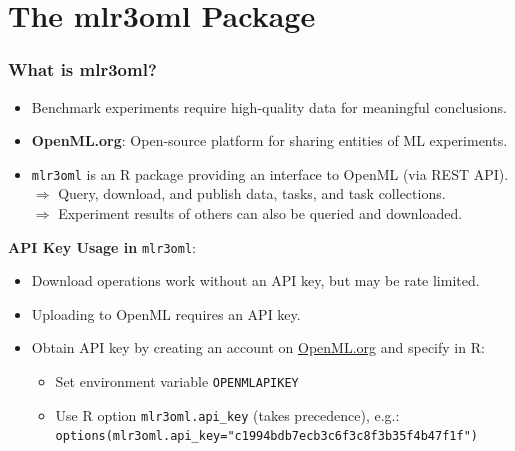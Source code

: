 \documentclass[10pt,compress,t,notes=noshow, xcolor=table]{beamer}
\begin{document}
\section{The mlr3oml Package}
\begin{frame}[fragile]
\frametitle{What is mlr3oml?}


\begin{itemize}
  \item Benchmark experiments require high-quality data for meaningful conclusions.
  \item \textbf{OpenML.org}: Open-source platform for sharing entities of ML experiments.
  \item \texttt{mlr3oml} is an R package providing an interface to OpenML (via  REST API).\\
  $\Rightarrow$ Query, download, and publish data, tasks, and task collections.\\
  $\Rightarrow$ Experiment results of others can also be queried and downloaded.
\end{itemize}

\textbf{API Key Usage in} \texttt{mlr3oml}:
\begin{itemize}
  \item Download operations work without an API key, but may be rate limited.
  \item Uploading to OpenML requires an API key.
  \item Obtain API key by creating an account on \url{OpenML.org} and specify in R:
  \begin{itemize}
    \item Set environment variable \texttt{OPENMLAPIKEY}
    \item Use R option \texttt{mlr3oml.api\_key} (takes precedence), e.g.:\\
    \texttt{options(mlr3oml.api\_key="c1994bdb7ecb3c6f3c8f3b35f4b47f1f")}
  \end{itemize}
\end{itemize}

\end{frame}
\end{document}
